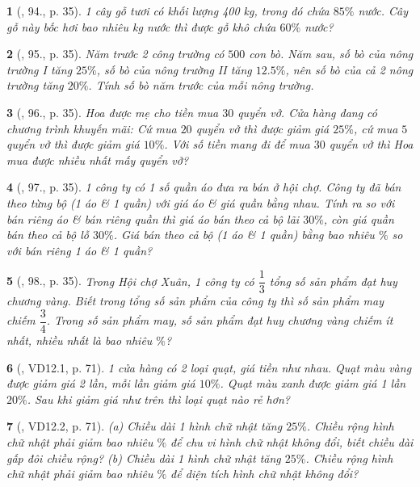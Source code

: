 \documentclass{article}
\newtheorem{baitoan}{}
\begin{document}
\begin{baitoan}[\cite{Binh_Toan_6_tap_2}, 94., p. 35]
	1 cây gỗ tươi có khối lượng {\rm400 kg}, trong đó chứa $85\%$ nước. Cây gỗ này bốc hơi bao nhiêu {\rm kg} nước thì được gỗ khô chứa $60\%$ nước?
\end{baitoan}

\begin{baitoan}[\cite{Binh_Toan_6_tap_2}, 95., p. 35]
	Năm trước 2 công trường có $500$ con bò. Năm sau, số bò của nông trường I tăng $25\%$, số bò của nông trường II tăng $12.5\%$, nên số bò của cả 2 nông trường tăng $20\%$. Tính số bò năm trước của mỗi nông trường.
\end{baitoan}

\begin{baitoan}[\cite{Binh_Toan_6_tap_2}, 96., p. 35]
	Hoa được mẹ cho tiền mua $30$ quyển vở. Cửa hàng đang có chương trình khuyến mãi: Cứ mua $20$ quyển vở thì được giảm giá $25\%$, cứ mua $5$ quyển vở thì được giảm giá $10\%$. Với số tiền mang đi để mua $30$ quyển vở thì Hoa mua được nhiều nhất mấy quyển vở?
\end{baitoan}

\begin{baitoan}[\cite{Binh_Toan_6_tap_2}, 97., p. 35]
	1 công ty có 1 số quần áo đưa ra bán ở hội chợ. Công ty đã bán theo từng bộ (1 áo \& 1 quần) với giá áo \& giá quần bằng nhau. Tính ra so với bán riêng áo \& bán riêng quần thì giá áo bán theo cả bộ lãi $30\%$, còn giá quần bán theo cả bộ lỗ $30\%$. Giá bán theo cả bộ (1 áo \& 1 quần) bằng bao nhiêu $\%$ so với bán riêng 1 áo \& 1 quần?
\end{baitoan}

\begin{baitoan}[\cite{Binh_Toan_6_tap_2}, 98., p. 35]
	Trong Hội chợ Xuân, 1 công ty có $\dfrac{1}{3}$ tổng số sản phẩm đạt huy chương vàng. Biết trong tổng số sản phẩm của công ty thì số sản phẩm may chiếm $\dfrac{3}{4}$. Trong số sản phẩm may, số sản phẩm đạt huy chương vàng chiếm ít nhất, nhiều nhất là bao nhiêu $\%$?
\end{baitoan}

\begin{baitoan}[\cite{TLCT_THCS_Toan_6_so_hoc}, VD12.1, p. 71]
	1 cửa hàng có 2 loại quạt, giá tiền như nhau. Quạt màu vàng được giảm giá 2 lần, mỗi lần giảm giá $10\%$. Quạt màu xanh được giảm giá 1 lần $20\%$. Sau khi giảm giá như trên thì loại quạt nào rẻ hơn?
\end{baitoan}

\begin{baitoan}[\cite{TLCT_THCS_Toan_6_so_hoc}, VD12.2, p. 71]
	(a) Chiều dài 1 hình chữ nhật tăng $25\%$. Chiều rộng hình chữ nhật phải giảm bao nhiêu $\%$ để chu vi hình chữ nhật không đổi, biết chiều dài gấp đôi chiều rộng? (b) Chiều dài 1 hình chữ nhật tăng $25\%$. Chiều rộng hình chữ nhật phải giảm bao nhiêu $\%$ để diện tích hình chữ nhật không đổi?
\end{baitoan}
\end{document}
